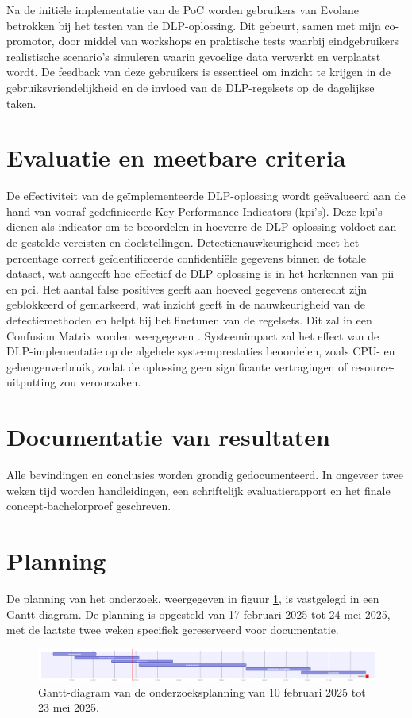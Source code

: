 Na de initiële implementatie van de PoC worden gebruikers van Evolane betrokken bij het testen van de DLP-oplossing. 
Dit gebeurt, samen met mijn co-promotor, door middel van workshops en praktische tests waarbij eindgebruikers realistische scenario's simuleren waarin gevoelige data verwerkt en verplaatst wordt. 
De feedback van deze gebruikers is essentieel om inzicht te krijgen in de gebruiksvriendelijkheid en de invloed van de DLP-regelsets op de dagelijkse taken. 

\section{Evaluatie en meetbare criteria}%

De effectiviteit van de geïmplementeerde DLP-oplossing wordt geëvalueerd aan de hand van vooraf gedefinieerde Key Performance Indicators (\gls{kpi}'s). 
Deze \gls{kpi}'s dienen als indicator om te beoordelen in hoeverre de DLP-oplossing voldoet aan de gestelde vereisten en doelstellingen.
Detectienauwkeurigheid meet het percentage correct geïdentificeerde confidentiële gegevens binnen de totale dataset, 
wat aangeeft hoe effectief de DLP-oplossing is in het herkennen van \gls{pii} en \gls{pci}. 
Het aantal false positives geeft aan hoeveel gegevens onterecht zijn geblokkeerd of gemarkeerd, 
wat inzicht geeft in de nauwkeurigheid van de detectiemethoden en helpt bij het finetunen van de regelsets. 
Dit zal in een Confusion Matrix worden weergegeven \autocite{Microsoftn.d.}.
Systeemimpact zal het effect van de DLP-implementatie op de algehele systeemprestaties beoordelen, zoals CPU- en 
geheugenverbruik, zodat de oplossing geen significante vertragingen of resource-uitputting zou veroorzaken.

\section{Documentatie van resultaten}%

Alle bevindingen en conclusies worden grondig gedocumenteerd. 
In ongeveer twee weken tijd worden handleidingen, een schriftelijk evaluatierapport en het finale concept-bachelorproef geschreven.

\section{Planning}%
\label{sec:planning}

De planning van het onderzoek, weergegeven in figuur \ref{fig:gantBP}, is vastgelegd in een Gantt-diagram. De planning is opgesteld van 17 februari 2025 tot 24 mei 2025, met de laatste twee weken specifiek gereserveerd voor documentatie.

\begin{figure}
  \centering
  \includegraphics[scale=0.50]
  {img/ganttupdate.png}
  \caption{\label{fig:gantBP}Gantt-diagram van de onderzoeksplanning van 10 februari 2025 tot 23 mei 2025.}
\end{figure}
